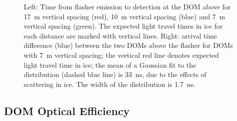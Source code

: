 \begin{figure}[!h]
  \captionsetup[subfigure]{labelformat=empty}
  \centering
  \caption{Left: Time from flasher emission to detection at the DOM above for 17~m vertical spacing
    (red), 10~m vertical spacing (blue) and 7~m vertical spacing
    (green). The expected light travel times in ice for each distance are marked with
    vertical lines. Right: arrival time difference (blue) between the two
    DOMs above the flasher for DOMs with 7~m vertical spacing; the
    vertical red line denotes expected light
    travel time in ice; the mean of a Gaussian fit to the distribution
    (dashed blue line) is 33~ns, due to
    the effects of scattering in ice. The width of the distribution is 1.7~ns.}
  \label{fig:flashertiming}
\end{figure}

\subsection{\label{sec:domeff}DOM Optical Efficiency}

